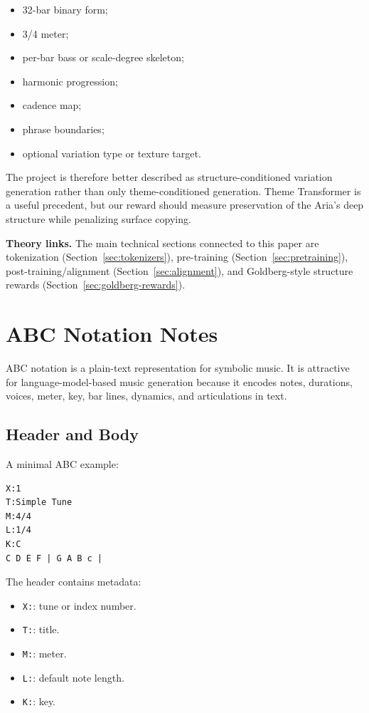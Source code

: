 \documentclass[11pt]{article}
\begin{document}
\begin{itemize}[leftmargin=*]
  \item 32-bar binary form;
  \item 3/4 meter;
  \item per-bar bass or scale-degree skeleton;
  \item harmonic progression;
  \item cadence map;
  \item phrase boundaries;
  \item optional variation type or texture target.
\end{itemize}

The project is therefore better described as structure-conditioned variation
generation rather than only theme-conditioned generation. Theme Transformer is a
useful precedent, but our reward should measure preservation of the Aria's deep
structure while penalizing surface copying.

\textbf{Theory links.}
The main technical sections connected to this paper are tokenization
(Section~\ref{sec:tokenizers}), pre-training (Section~\ref{sec:pretraining}),
post-training/alignment (Section~\ref{sec:alignment}), and Goldberg-style
structure rewards (Section~\ref{sec:goldberg-rewards}).

\section{ABC Notation Notes}
\label{sec:abc}

ABC notation is a plain-text representation for symbolic music. It is attractive
for language-model-based music generation because it encodes notes, durations,
voices, meter, key, bar lines, dynamics, and articulations in text.

\subsection{Header and Body}

A minimal ABC example:

\begin{verbatim}
X:1
T:Simple Tune
M:4/4
L:1/4
K:C
C D E F | G A B c |
\end{verbatim}

The header contains metadata:

\begin{itemize}[leftmargin=*]
  \item \verb|X:|: tune or index number.
  \item \verb|T:|: title.
  \item \verb|M:|: meter.
  \item \verb|L:|: default note length.
  \item \verb|K:|: key.
\end{itemize}
\end{document}
